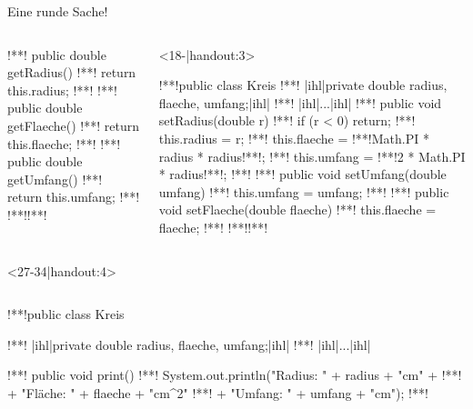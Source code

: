 \begin{frame}[c,fragile]{Eine runde Sache!}
\begin{onlyenv}
\begin{columns}[c,onlytextwidth]
\begin{onlyenv}
\begin{plainjava}
{!**!   public double getRadius() {
!**!       return this.radius;
!**!   }
!**!   public double getFlaeche() {
!**!       return this.flaeche;
!**!   }
!**!   public double getUmfang() {
!**!       return this.umfang;
!**!   }
!**!}!**!
\end{plainjava}
\end{onlyenv}
\begin{onlyenv}<18-|handout:3>
\begin{plainjava}
!**!public class Kreis {
!**!   |ihl|private double radius, flaeche, umfang;|ihl|
!**!   |ihl|...|ihl|
!**!   public void setRadius(double r) {
!**!       if (r < 0) return;
!**!       this.radius = r;
!**!       this.flaeche = !**!Math.PI * radius * radius!**!;
!**!       this.umfang = !**!2 * Math.PI * radius!**!;
!**!   }
!**!   public void setUmfang(double umfang) {
!**!       this.umfang = umfang;
!**!   }
!**!   public void setFlaeche(double flaeche) {
!**!       this.flaeche = flaeche;
!**!   }
!**!}!**!
\end{plainjava}
\end{onlyenv}
\end{columns}
\end{onlyenv}
\begin{onlyenv}<27-34|handout:4>
\begin{columns}[c,onlytextwidth]
\footnotesize{}\medskip\par
{}
\SetupLstHl
\begin{plainjava}
!**!public class Kreis {
!**!   |ihl|private double radius, flaeche, umfang;|ihl|
!**!   |ihl|...|ihl|

!**!   public void print() {
!**!      System.out.println("Radius: " + radius + "cm" +
!**!           + "\n Fläche: " + flaeche + "cm^2"
!**!           + "\n Umfang: " + umfang + "cm");
!**!   }

}
\end{plainjava}
\end{columns}
\end{onlyenv}
\end{frame}
